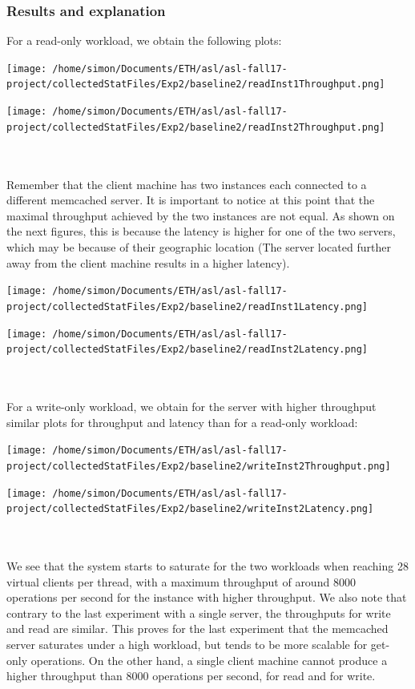 \documentclass[11pt,a4paper]{article}
\begin{document}
\subsubsection{Results and explanation}
For a read-only workload, we obtain the following plots:
\\
\begin{minipage}{0.5\linewidth}
\texttt{[image: /home/simon/Documents/ETH/asl/asl-fall17-project/collectedStatFiles/Exp2/baseline2/readInst1Throughput.png]}
\end{minipage}
\hfill
\begin{minipage}{0.5\linewidth}
\texttt{[image: /home/simon/Documents/ETH/asl/asl-fall17-project/collectedStatFiles/Exp2/baseline2/readInst2Throughput.png]}
\end{minipage}
\\\\
Remember that the client machine has two instances each connected to a different memcached server. It is important to notice at this point that the maximal throughput achieved by the two instances are not equal. As shown on the next figures, this is because the latency is higher for one of the two servers, which may be because of their geographic location (The server located further away from the client machine results in a higher latency).
\begin{minipage}{0.5\linewidth}
\texttt{[image: /home/simon/Documents/ETH/asl/asl-fall17-project/collectedStatFiles/Exp2/baseline2/readInst1Latency.png]}
\end{minipage}
\hfill
\begin{minipage}{0.5\linewidth}
\texttt{[image: /home/simon/Documents/ETH/asl/asl-fall17-project/collectedStatFiles/Exp2/baseline2/readInst2Latency.png]}
\end{minipage}
\\\\
For a write-only workload, we obtain for the server with higher throughput similar plots for throughput and latency than for a read-only workload:
\\
\begin{minipage}{0.5\linewidth}
\texttt{[image: /home/simon/Documents/ETH/asl/asl-fall17-project/collectedStatFiles/Exp2/baseline2/writeInst2Throughput.png]}
\end{minipage}
\hfill
\begin{minipage}{0.5\linewidth}
\texttt{[image: /home/simon/Documents/ETH/asl/asl-fall17-project/collectedStatFiles/Exp2/baseline2/writeInst2Latency.png]}
\end{minipage}
\\
\\
We see that the system starts to saturate for the two workloads when reaching 28 virtual clients per thread, with a maximum throughput of around 8000 operations per second for the instance with higher throughput.  
We also note that contrary to the last experiment with a single server, the throughputs for write and read are similar. This proves for the last experiment that the memcached server saturates under a high workload, but tends to be more scalable for get-only operations. On the other hand, a single client machine cannot produce a higher throughput than 8000 operations per second, for read and for write.   
\end{document}
